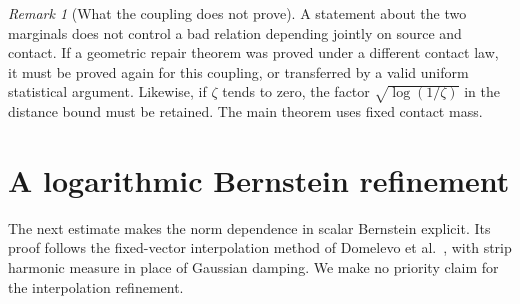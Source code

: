 \documentclass[11pt]{article}
\theoremstyle{remark}\newtheorem{remark}[theorem]{Remark}
\newcommand{\1}{\mathbf 1}\newcommand{\norm}[2]{\lVert #1\rVert_{#2}}
\begin{document}
\begin{remark}[What the coupling does not prove]
A statement about the two marginals does not control a bad relation depending jointly on source and contact. If a geometric repair theorem was proved under a different contact law, it must be proved again for this coupling, or transferred by a valid uniform statistical argument. Likewise, if $\zeta$ tends to zero, the factor $\sqrt{\log(1/\zeta)}$ in the distance bound must be retained. The main theorem uses fixed contact mass.
\end{remark}

\section{A logarithmic Bernstein refinement}\label{sec:log}
The next estimate makes the norm dependence in scalar Bernstein explicit. Its proof follows the fixed-vector interpolation method of Domelevo et al.\ \cite{Domelevo}, with strip harmonic measure in place of Gaussian damping. We make no priority claim for the interpolation refinement.
\end{document}
